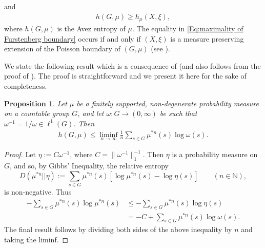 \documentclass[12pt]{amsart}
\newtheorem{prop}[thm]{Proposition}
\theoremstyle{definition}
\theoremstyle{remark}
\numberwithin{equation}{section}
\newcommand{\om}{\omega}
\begin{document}
and
\begin{align} \label{Eq:maximality of Furstenberg boundary}
h(G,\mu)\geq h_\mu(X,\xi),
\end{align}
where $h(G,\mu)$ is the Avez entropy of $\mu$.
The equality in \eqref{Eq:maximality of Furstenberg boundary} occurs if and only if $(X,\xi)$ is a measure preserving extension of the Poisson boundary of $(G,\mu)$
(see \cite{Furs-Glas 1}).

We state the following result which is a consequence of \cite[Theorem 3.11]{ASdLSS2} (and also follows from the proof of  \cite[Theorem 4.7]{ASdLSS1}).  The proof is straightforward and we present it here for the sake of completeness.

\begin{prop}\label{P:Lyap Expo dominates entropy-inverse integrable weights}
Let $\mu$ be a finitely supported, non-degenerate probability measure on a countable group $G$, and let 
$\omega\colon G \to (0,\infty)$ be such that $\omega^{-1} = 1/\omega \in \ell^1(G)$. Then 
\begin{align*}
h(G,\mu) \leq \liminf_{n\to \infty} \frac{1}{n}\sum_{s\in G}\mu^{* n} (s) \log \omega (s).
\end{align*}

\end{prop}

\begin{proof}
Let $\eta:=C\omega^{-1}$, where $C=\|\omega^{-1}\|_1^{-1}$. Then $\eta$ is a probability measure on $G$, and so, by Gibbs' Inequality, the relative entropy 
$$D(\mu^{*n}||\eta):=\sum_{s\in G} \mu^{*n}(s)[\log \mu^{*n}(s)-\log \eta(s)] \qquad (n\in \mathbb{N}),$$
is non-negative. Thus
\begin{align*}
-\sum_{s\in G} \mu^{*n}(s)\log \mu^{*n}(s) &\leq -\sum_{s\in G} \mu^{*n}(s)\log \eta(s)\\ 
&=-C+\sum_{s\in G}\mu^{* n} (s) \log \omega (s).
\end{align*}
The final result follows by dividing both sides of the above inequality by $n$ and taking the liminf.
\end{proof}
\end{document}
